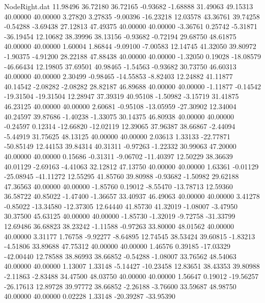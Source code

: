 \begin{filecontents}{NodeRight.dat}
  11.98496   36.72180   36.72165    -0.93682   -1.68888   31.49063   49.15313   40.00000   40.00000    3.27820    3.27835   -9.00396  -16.23218
  12.03578   43.36761   39.74258    -0.54288   -3.69438   27.12813   47.49375   40.00000   40.00000   -3.36761    0.25742   -5.31871  -36.19454
  12.10682   38.39996   38.13156    -0.93682   -0.72194   29.68750   48.61875   40.00000   40.00000    1.60004    1.86844   -9.09100   -7.00583
  12.14745   41.32050   39.80972    -1.90375   -4.91200   28.22188   47.88438   40.00000   40.00000   -1.32050    0.19028  -18.08579  -46.66434
  12.19805   37.69501   40.98465    -1.54563   -0.93682   30.73750   46.60313   40.00000   40.00000    2.30499   -0.98465  -14.55853   -8.82403
  12.24882   41.11877   40.14542    -2.08282   -2.08282   28.82187   46.89688   40.00000   40.00000   -1.11877   -0.14542  -19.31504  -19.31504
  12.28947   37.39319   40.95108    -1.50982   -3.15719   31.41875   46.23125   40.00000   40.00000    2.60681   -0.95108  -13.05959  -27.30902
  12.34004   40.24597   39.87686    -1.40238   -1.33075   30.14375   46.80938   40.00000   40.00000   -0.24597    0.12314  -12.66820  -12.02119
  12.39065   37.96387   38.66867    -2.44094   -5.44919   31.75625   48.13125   40.00000   40.00000    2.03613    1.33133  -22.77871  -50.85149
  12.44153   39.84314   40.31311    -0.97263   -1.22332   30.99063   47.20000   40.00000   40.00000    0.15686   -0.31311   -9.06702  -11.40397
  12.50229   38.36639   40.01129    -2.69163   -4.41063   32.12812   47.13750   40.00000   40.00000    1.63361   -0.01129  -25.08945  -41.11272
  12.55295   41.85760   39.80988    -0.93682   -1.50982   29.62188   47.36563   40.00000   40.00000   -1.85760    0.19012   -8.55470  -13.78713
  12.59360   36.58722   40.85022    -1.47400   -1.36657   33.40937   46.49063   40.00000   40.00000    3.41278   -0.85022  -13.34580  -12.37305
  12.64440   41.85730   41.32019    -1.08007   -3.47950   30.37500   45.63125   40.00000   40.00000   -1.85730   -1.32019   -9.72758  -31.33799
  12.69486   36.68823   38.23242    -1.11588   -0.97263   33.80000   48.01562   40.00000   40.00000    3.31177    1.76758   -9.92277   -8.64895
  12.74545   38.53424   39.60815    -1.83213   -4.51806   33.89688   47.75312   40.00000   40.00000    1.46576    0.39185  -17.03329  -42.00440
  12.78588   38.86993   38.66852    -0.54288   -1.08007   33.76562   48.54063   40.00000   40.00000    1.13007    1.33148   -5.14427  -10.23458
  12.83651   38.43353   39.80988    -2.11863   -2.83488   34.47500   48.03750   40.00000   40.00000    1.56647    0.19012  -19.56257  -26.17613
  12.89728   39.97772   38.66852    -2.26188   -3.76600   33.59687   48.98750   40.00000   40.00000    0.02228    1.33148  -20.39287  -33.95390

\end{filecontents}
